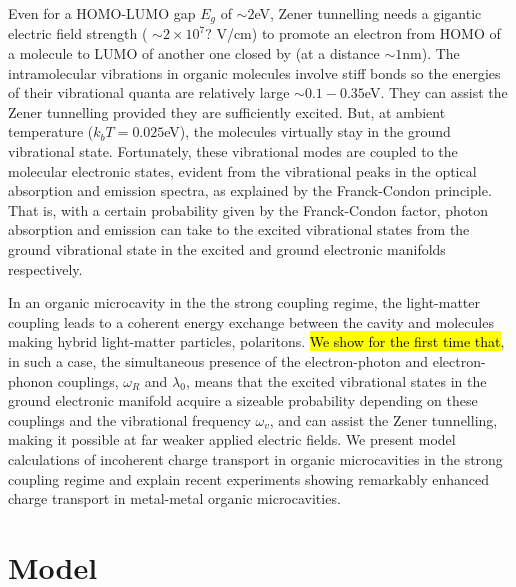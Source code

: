\documentclass[a4paper,twocolumn]{revtex4-1} %
\begin{document}
Even for a %
HOMO-LUMO gap $E_g$ of $\sim2$eV,
Zener tunnelling needs a gigantic electric field strength
( $\sim 2\times10^{7}?$ V/cm)
 to promote an electron from HOMO of a molecule to
 LUMO of another one closed by (at a distance $\sim1$nm).
 The intramolecular vibrations in organic molecules
 involve stiff bonds so the energies of their vibrational quanta 
 are relatively large $\sim 0.1-0.35$eV. 
 They can assist the Zener tunnelling provided they are sufficiently excited.
 But, at ambient temperature ($k_bT=0.025$eV), 
 the molecules virtually stay in the ground vibrational state.
 Fortunately, these %
  vibrational modes are coupled
  to the molecular electronic states, evident from
  the vibrational peaks in the optical absorption
   and emission spectra, 
   as explained by the Franck-Condon principle.
  That is, with a certain probability given by the Franck-Condon factor, photon absorption and emission can take to the excited vibrational states from the ground vibrational state in the excited and ground electronic manifolds respectively. 
 
 In an organic microcavity in the the strong coupling regime, the light-matter coupling leads to 
 a coherent energy exchange between the cavity and molecules
  making hybrid light-matter particles, polaritons.
 \hl {We show for the first time that},
   in such a case, 
  the simultaneous presence of the electron-photon and electron-phonon couplings, $\omega_R$ and $\lambda_0$, means that
   the excited vibrational states
   in the ground electronic manifold acquire a sizeable probability
  depending on
   these couplings
     and the vibrational frequency $\omega_v$,
     and can assist the Zener tunnelling,
      making it possible at far weaker applied electric fields.
    We present model calculations of incoherent charge transport in organic microcavities in the strong coupling regime and
explain recent experiments showing remarkably enhanced charge transport in metal-metal organic microcavities.
  
 
    
 
 
 
 




  
 
 
 
 
  


\section{Model}
\end{document}
